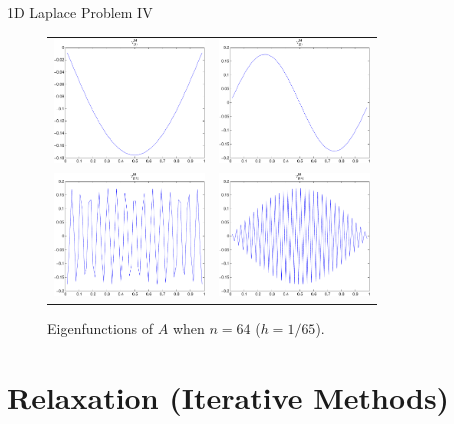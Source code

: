 \documentclass{beamer}
\begin{document}
\begin{frame}{1D Laplace Problem IV}
 \begin{figure}
  \begin{tabular}{cc}
   \includegraphics[width=4cm]{images/v64_1.pdf} & \includegraphics[width=4cm]{images/v64_2.pdf} \\
   \includegraphics[width=4cm]{images/v64_31.pdf} & \includegraphics[width=4cm]{images/v64_64.pdf}
  \end{tabular}
  \caption{Eigenfunctions of $A$ when $n=64$ ($h=1/65$).}
 \end{figure}
\end{frame}

\section{Relaxation (Iterative Methods)}%
\end{document}
